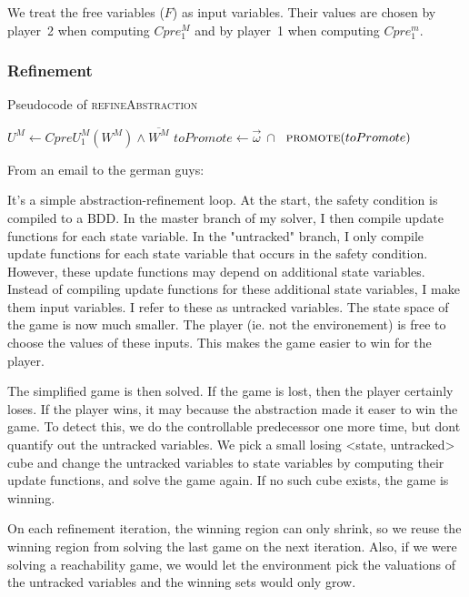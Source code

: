 \documentclass[a4paper,twoside,openright,11pt]{book}
\theoremstyle{definition}
\begin{document}
We treat the free variables ($F$) as input variables. Their values are chosen by player~2 when computing $Cpre_1^M$ and by player~1 when computing $Cpre_1^m$. 

\subsubsection{Refinement}

\begin{algorithm}

\caption{Pseudocode of \textsc{refineAbstraction}}
\label{alg:refineAbstraction}

\begin{algorithmic}[1]
    \State $U^M \gets CpreU_1^M(W^M) \land \overline{W^M}$
    \State $toPromote \gets \vec{\omega}~\cap~$
    \State $\Call{promote}{toPromote}$
\EndFunction
\end{algorithmic}
\end{algorithm}

From an email to the german guys:

It's a simple abstraction-refinement loop. At the start, the safety condition is compiled to a BDD. In the master branch of my solver, I then compile update functions for each state variable. In the "untracked" branch, I only compile update functions for each state variable that occurs in the safety condition. However, these update functions may depend on additional state variables. Instead of compiling update functions for these additional state variables, I make them input variables. I refer to these as untracked variables. The state space of the game is now much smaller. The player (ie. not the environement) is free to choose the values of these inputs. This makes the game easier to win for the player.

The simplified game is then solved. If the game is lost, then the player certainly loses. If the player wins, it may because the abstraction made it easer to win the game. To detect this, we do the controllable predecessor one more time, but dont quantify out the untracked variables. We pick a small losing <state, untracked> cube and change the untracked variables to state variables by computing their update functions, and solve the game again. If no such cube exists, the game is winning.

On each refinement iteration, the winning region can only shrink, so we reuse the winning region from solving the last game on the next iteration. Also, if we were solving a reachability game, we would let the environment pick the valuations of the untracked variables and the winning sets would only grow.
\end{document}
